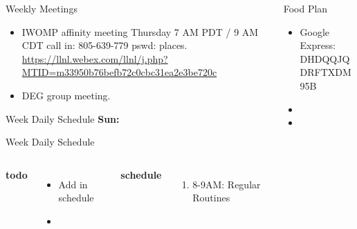 \documentclass[serif, mathserif, final]{beamer}
\begin{document}
\begin{frame}
\begin{columns}
\begin{column}{0.5\linewidth}
  \begin{block}{Weekly Meetings}
    \begin{itemize} 
    \item \tiny IWOMP affinity meeting Thursday 7 AM PDT / 9 AM
      CDT call in: 805-639-779 pswd: places. 
      \url{https://llnl.webex.com/llnl/j.php?MTID=m33950b76befb72c0cbc31ea2e3be720c}
    \item \tiny DEG group meeting.  
    \end{itemize}
  \end{block} 
      
  \begin{block}{Week Daily Schedule} 
    {\bf Sun:} 
  \end{block} 

  \begin{block}{Week Daily Schedule} 
    \begin{columns}
      \textbf{\small todo} \\ 
      \begin{itemize}
        \tiny \item \tiny Add in schedule
      \item \tiny 
      \end{itemize} 
      \textbf{\small schedule} \\
      \begin{enumerate} 
        \tiny \item \tiny 8-9AM: Regular Routines 
      \end{enumerate} 
    \end{columns} 
  \end{block} 
\end{column}

\begin{column}{0.25\linewidth}
  
  \begin{block}{Food Plan} 
    \begin{itemize}
      \tiny \item \tiny Google Express: DHDQQJQDRFTXDM95B
    \item \tiny 
    \item \tiny 
    \end{itemize}
  \end{block} 
  

\end{column}
\end{columns}
\end{frame}
\end{document}

